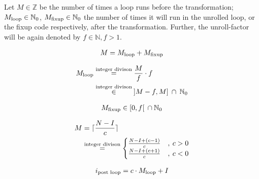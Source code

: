 Let $M \in \mathbb{Z}$ be the number of times a loop runs before the transformation; $M_{\text{loop}} \in \mathbb{N}_0$, $M_{\text{fixup}} \in \mathbb{N}_0$ the number of times it will run in the unrolled loop, or the fixup code respectively, after the transformation.
Further, the unroll-factor will be again denoted by $f \in \mathbb{N}, f > 1$.

\begin{equation}\label{eqn:impl:fixup:duff:conserve-semantics-identity}
    \begin{aligned}
        M = M_{\text{loop}} + M_{\text{fixup}}
    \end{aligned}
\end{equation}

\begin{equation}\label{eqn:impl:fixup:duff:loop-iterations}
    \begin{aligned}
        M_{\text{loop}} &\overset{\text{integer divison}}{=} \frac{M}{f} \cdot f\\
        &\overset{\text{integer divison}}{\in} \medspace \rbrack M-f,M \rbrack \medspace \cap \medspace \mathbb{N}_0
    \end{aligned}
\end{equation}

\begin{equation}\label{eqn:impl:fixup:duff:fixup-interval}
    \begin{aligned}
        M_{\text{fixup}} \in \lbrack0, f\lbrack \medspace \medspace \cap \medspace \mathbb{N}_0
    \end{aligned}
\end{equation}

\begin{equation}\label{eqn:impl:fixup:duff:total-iteration-based-on-bounds}
    \begin{aligned}
        M &= \lceil{}\frac{N - I}{c}\rceil{} \\
        & \overset{\text{integer divison}}{=}
        \begin{cases}
              \frac{N - I + (c - 1)}{c} &, \medspace c > 0\\
              \frac{N - I + (c + 1)}{c} &, \medspace c < 0
        \end{cases}
    \end{aligned}
\end{equation}

\begin{equation}\label{eqn:impl:fixup:duff:i-after-loop}
    \begin{aligned}
        i_\text{post loop} = c \cdot M_{\text{loop}} + I
    \end{aligned}
\end{equation}

